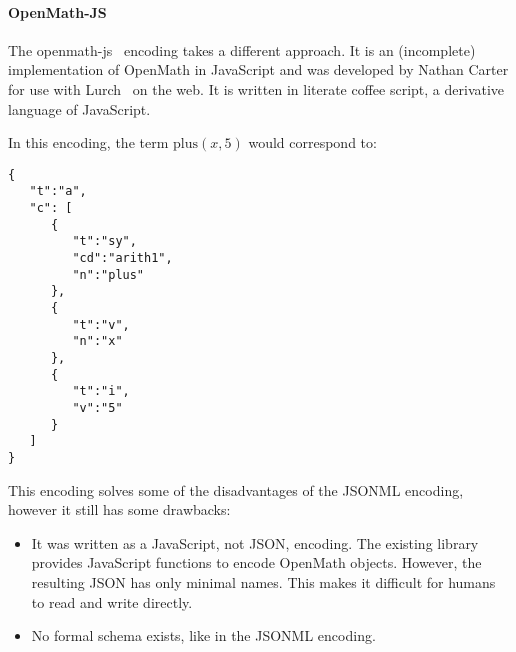 \paragraph{OpenMath-JS}
The openmath-js~\cite{openmathjs:webpage} encoding takes a different approach. 
It is an (incomplete) implementation of OpenMath in JavaScript and was developed by Nathan Carter for use with Lurch~\cite{CarterMonks:OM:CICM-WS-WiP2013} on the web. 
It is written in literate coffee script, a derivative language of JavaScript. 

In this encoding, the term $\mathrm{plus}(x, 5)$ would correspond to: 
\begin{lstlisting}
{  
   "t":"a",
   "c": [  
      {  
         "t":"sy",
         "cd":"arith1",
         "n":"plus"
      },
      {  
         "t":"v",
         "n":"x"
      },
      {  
         "t":"i",
         "v":"5"
      }
   ]
}
\end{lstlisting}

This encoding solves some of the disadvantages of the JSONML encoding, however it still has some drawbacks:

\begin{itemize}
\item It was written as a JavaScript, not JSON, encoding.  The existing library provides
  JavaScript functions to encode OpenMath objects.  However, the resulting JSON has only
  minimal names.  This makes it difficult for humans to read and write directly.
\item No formal schema exists, like in the JSONML encoding.
\end{itemize}


